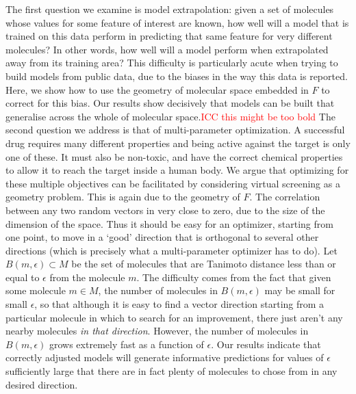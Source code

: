 \documentclass{article}
\begin{document}
\newline
\newline
The first question we examine is model extrapolation: given a set of molecules whose values for some feature of interest are known, how well will a model that is trained on this data perform in predicting that same feature for very different molecules? In other words, how well will a model perform when extrapolated away from its training area? This difficulty is particularly acute when trying to build models from public data, due to the biases in the way this data is reported\cite{Kalliokoski2013,Tiikkainen2013}. Here, we show how to use the geometry of molecular space embedded in $F$ to correct for this bias. Our results show decisively that models can be built that generalise across the whole of molecular space.\textcolor{red}{ICC this might be too bold}  
\newline
\newline
The second question we address is that of multi-parameter optimization.  A successful drug requires many different properties and being active against the target is only one of these.  It must also be non-toxic, and have the correct chemical properties to allow it to reach the target inside a human body.  We argue that optimizing for these multiple objectives can be facilitated by considering virtual screening as a geometry problem.
This is again due to the geometry of $F$. The correlation between any two random vectors in very close to zero, due to the size of the dimension of the space.  Thus it should be easy for an optimizer, starting from one point, to move in a `good' direction that is orthogonal to several other directions (which is precisely what a multi-parameter optimizer has to do).  Let $B(m, \epsilon) \subset M$ be the set of molecules that are Tanimoto distance less than or equal to $\epsilon$ from the molecule $m$.  The difficulty comes from the fact that given some molecule $m \in M$, the number of molecules in  $B(m, \epsilon)$ may be small for small $\epsilon$, so that although it is easy to find a vector direction starting from a particular molecule in which to search for an improvement, there just aren't any nearby molecules \textit{in that direction}. However, the number of molecules in $B(m, \epsilon)$ grows extremely fast as a function of $\epsilon$.  Our results indicate that correctly adjusted models will generate informative predictions for values of $\epsilon$ sufficiently large that there are in fact plenty of molecules to chose from in any desired direction.
\end{document}
